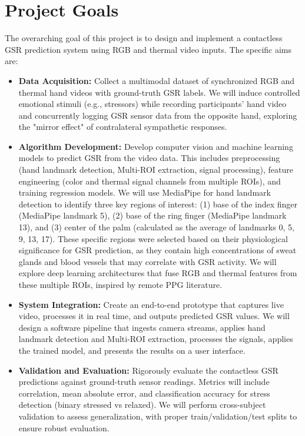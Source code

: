 \documentclass[12pt]{article}
\begin{document}
    \section{Project Goals}
    The overarching goal of this project is to design and implement a contactless GSR prediction system using RGB and thermal video inputs. The specific aims are:
    \begin{itemize}
        \item \textbf{Data Acquisition:} Collect a multimodal dataset of synchronized RGB and thermal hand videos with ground-truth GSR labels. We will induce controlled emotional stimuli (e.g., stressors) while recording participants' hand video and concurrently logging GSR sensor data from the opposite hand, exploring the "mirror effect" of contralateral sympathetic responses.
        \item \textbf{Algorithm Development:} Develop computer vision and machine learning models to predict GSR from the video data. This includes preprocessing (hand landmark detection, Multi-ROI extraction, signal processing), feature engineering (color and thermal signal channels from multiple ROIs), and training regression models. We will use MediaPipe for hand landmark detection to identify three key regions of interest: (1) base of the index finger (MediaPipe landmark 5), (2) base of the ring finger (MediaPipe landmark 13), and (3) center of the palm (calculated as the average of landmarks 0, 5, 9, 13, 17). These specific regions were selected based on their physiological significance for GSR prediction, as they contain high concentrations of sweat glands and blood vessels that may correlate with GSR activity. We will explore deep learning architectures that fuse RGB and thermal features from these multiple ROIs, inspired by remote PPG literature.
        \item \textbf{System Integration:} Create an end-to-end prototype that captures live video, processes it in real time, and outputs predicted GSR values. We will design a software pipeline that ingests camera streams, applies hand landmark detection and Multi-ROI extraction, processes the signals, applies the trained model, and presents the results on a user interface.
        \item \textbf{Validation and Evaluation:} Rigorously evaluate the contactless GSR predictions against ground-truth sensor readings. Metrics will include correlation, mean absolute error, and classification accuracy for stress detection (binary stressed vs relaxed). We will perform cross-subject validation to assess generalization, with proper train/validation/test splits to ensure robust evaluation.

\end{itemize}
\end{document}

